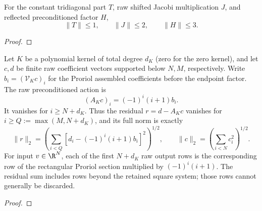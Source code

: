 \begin{supporting}
\begin{theorem}
\label{thm:raw-jacobi-norm-bounds}
\leanok
For the constant tridiagonal part $T$, raw shifted Jacobi multiplication $J$,
and reflected preconditioned factor $H$,
\[
 \|T\|\le1,\qquad \|J\|\le2,\qquad \|H\|\le3.
\]

\end{theorem}
\begin{proof}
\leanok
\end{proof}


\begin{theorem}
\label{thm:volterra-finite-residual}
\leanok
Let $K$ be a polynomial kernel of total degree $d_K$ (zero for the zero kernel),
and let $c,d$ be finite
raw coefficient vectors supported below $N,M$, respectively. Write
$b_i=(\mathcal V_Kc)_i$ for the Proriol assembled coefficients before the
endpoint factor. The raw preconditioned action is
\[
 (A_Kc)_i=(-1)^i(i+1)b_i.
\]
It vanishes for $i\ge N+d_K$. Thus the residual $r=d-A_Kc$ vanishes for
$i\ge Q:=\max(M,N+d_K)$, and its full norm is exactly
\[
 \|r\|_2=\left(\sum_{i<Q}[d_i-(-1)^i(i+1)b_i]^2\right)^{1/2},\qquad
 \|c\|_2=\left(\sum_{i<N}c_i^2\right)^{1/2}.
\]
For input $v\in\R^N$, each of the first $N+d_K$ raw output rows is the
corresponding row of the rectangular Proriol section multiplied by
$(-1)^i(i+1)$. The residual sum includes rows beyond the retained square
system; those rows cannot generally be discarded.
\end{theorem}
\begin{proof}
\leanok
\end{proof}
\end{supporting}


